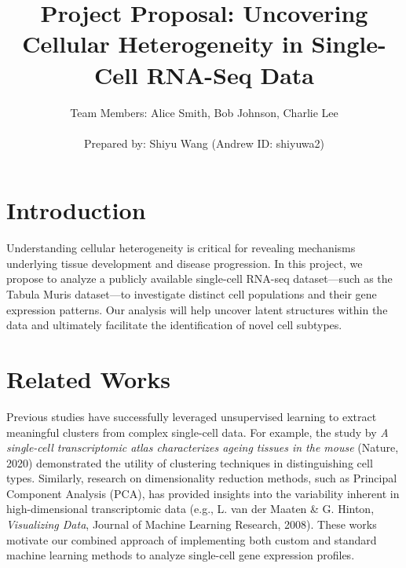 \documentclass[12pt,letterpaper]{article}
\begin{document}
\title{\textbf{Project Proposal: Uncovering Cellular Heterogeneity in Single-Cell RNA-Seq Data}}
\author{Team Members: Alice Smith, Bob Johnson, Charlie Lee \\ \\ Prepared by: Shiyu Wang (Andrew ID: shiyuwa2)}
\date{}
\setlength{\droptitle}{-2.75cm}
\maketitle
\vspace{-2cm}

\section*{Introduction}
Understanding cellular heterogeneity is critical for revealing mechanisms underlying tissue development and disease progression. In this project, we propose to analyze a publicly available single-cell RNA-seq dataset—such as the Tabula Muris dataset—to investigate distinct cell populations and their gene expression patterns. Our analysis will help uncover latent structures within the data and ultimately facilitate the identification of novel cell subtypes.

\section*{Related Works}
Previous studies have successfully leveraged unsupervised learning to extract meaningful clusters from complex single-cell data. For example, the study by \textit{A single-cell transcriptomic atlas characterizes ageing tissues in the mouse} (Nature, 2020) demonstrated the utility of clustering techniques in distinguishing cell types. Similarly, research on dimensionality reduction methods, such as Principal Component Analysis (PCA), has provided insights into the variability inherent in high-dimensional transcriptomic data (e.g., L. van der Maaten \& G. Hinton, \textit{Visualizing Data}, Journal of Machine Learning Research, 2008). These works motivate our combined approach of implementing both custom and standard machine learning methods to analyze single-cell gene expression profiles.
\end{document}
